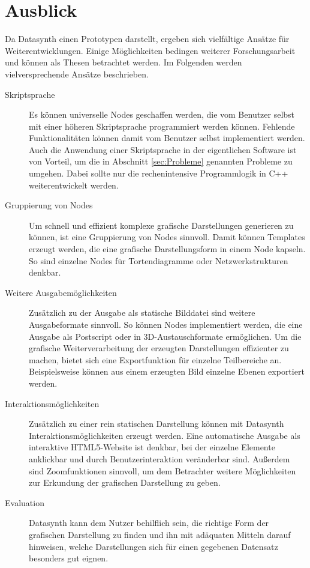 \documentclass[a4paper, 
               12pt,
               DIV=calc,
               version=first,
               pdftex,
               headsepline,
               footsepline,
               bibtotocnumbered,
               liststotocnumbered]{scrreprt}
\begin{document}
\section{Ausblick}
\label{sec:Ausblick}
Da Datasynth einen Prototypen darstellt, ergeben sich vielfältige
Ansätze für Weiterentwicklungen. Einige Möglichkeiten bedingen weiterer 
Forschungsarbeit und können als Thesen betrachtet werden. Im Folgenden
werden vielversprechende Ansätze beschrieben.
\begin{description}
\item[Skriptsprache]
Es können universelle Nodes geschaffen werden, die vom Benutzer selbst mit einer höheren
Skriptsprache programmiert werden können. Fehlende Funktionalitäten
können damit vom Benutzer selbst implementiert werden.
Auch die Anwendung einer Skriptsprache in der eigentlichen Software ist von Vorteil, um die in
Abschnitt \ref{sec:Probleme} genannten Probleme zu umgehen. Dabei sollte nur
die rechenintensive Programmlogik in C++ weiterentwickelt werden.
\item[Gruppierung von Nodes]
Um schnell und effizient komplexe grafische Darstellungen generieren zu können,
ist eine Gruppierung von Nodes sinnvoll. Damit können Templates erzeugt werden,
die eine grafische Darstellungsform in einem Node kapseln. So sind einzelne Nodes
für Tortendiagramme oder Netzwerkstrukturen denkbar.
\item[Weitere Ausgabemöglichkeiten]
Zusätzlich zu der Ausgabe als statische Bilddatei sind weitere Ausgabeformate sinnvoll.
So können Nodes implementiert werden, die eine Ausgabe als Postscript oder
in 3D-Austauschformate ermöglichen. Um die grafische Weiterverarbeitung der erzeugten
Darstellungen effizienter zu machen, bietet sich eine Exportfunktion für einzelne Teilbereiche
an. Beispielsweise können aus einem erzeugten Bild einzelne Ebenen exportiert werden.
\item[Interaktionsmöglichkeiten]
Zusätzlich zu einer rein statischen Darstellung können mit Datasynth
Interaktionsmöglichkeiten erzeugt werden. Eine automatische
Ausgabe als interaktive HTML5-Website ist denkbar, bei der einzelne Elemente
anklickbar und durch Benutzerinteraktion veränderbar sind. Außerdem sind 
Zoomfunktionen sinnvoll, um dem Betrachter weitere Möglichkeiten zur
Erkundung der grafischen Darstellung zu geben.
\item[Evaluation]
Datasynth kann dem Nutzer behilflich sein, die richtige Form
der grafischen Darstellung zu finden und ihn mit adäquaten Mitteln darauf
hinweisen, welche Darstellungen sich für einen gegebenen Datensatz besonders gut eignen.
\end{description}
    
\end{document}
